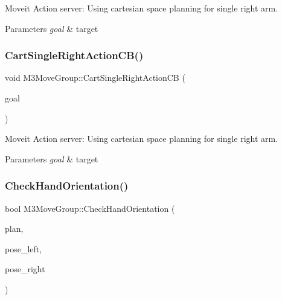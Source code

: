 Moveit Action server\+: Using cartesian space planning for single right arm. 


\begin{DoxyParams}{Parameters}
{\em goal} & target \\
\hline
\end{DoxyParams}
\mbox{\label{classM3MoveGroup_a6ce4ef5d30fc1e93826f4f8104f8db04}} 
\subsubsection{\texorpdfstring{Cart\+Single\+Right\+Action\+C\+B()}{CartSingleRightActionCB()}\hspace{0.1cm}{\footnotesize\ttfamily [2/2]}}
{\footnotesize\ttfamily void M3\+Move\+Group\+::\+Cart\+Single\+Right\+Action\+CB (\begin{DoxyParamCaption}\item[{const m3\+\_\+moveit\+::\+Moveit\+Single\+Goal\+Const\+Ptr \&}]{goal }\end{DoxyParamCaption})\hspace{0.3cm}{\ttfamily [inline]}}



Moveit Action server\+: Using cartesian space planning for single right arm. 


\begin{DoxyParams}{Parameters}
{\em goal} & target \\
\hline
\end{DoxyParams}
\mbox{\label{classM3MoveGroup_a65ac544bc2275fc3823bc66c3a2a7a19}} 
\subsubsection{\texorpdfstring{Check\+Hand\+Orientation()}{CheckHandOrientation()}\hspace{0.1cm}{\footnotesize\ttfamily [1/4]}}
{\footnotesize\ttfamily bool M3\+Move\+Group\+::\+Check\+Hand\+Orientation (\begin{DoxyParamCaption}\item[{const moveit\+::planning\+\_\+interface\+::\+Move\+Group\+::\+Plan}]{plan,  }\item[{const geometry\+\_\+msgs\+::\+Pose}]{pose\+\_\+left,  }\item[{const geometry\+\_\+msgs\+::\+Pose}]{pose\+\_\+right }\end{DoxyParamCaption})\hspace{0.3cm}{\ttfamily [inline]}}



